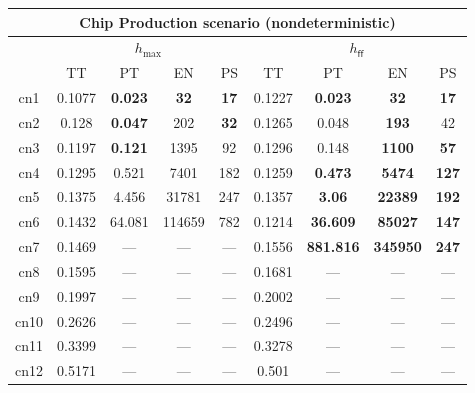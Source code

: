 \begin{tabular}{||c||c|c|c|c|c|c|c|c||}%
\multicolumn{9}{c}{\textbf{Chip Production scenario (nondeterministic)}}\\%
\hline%
&\multicolumn{4}{||c||}{$h_{\max}$}&\multicolumn{4}{||c||}{$h_{\mathsf{ff}}$}\\%
\hline%
&\small{TT}&\small{PT}&\small{EN}&\small{PS}&\small{TT}&\small{PT}&\small{EN}&\small{PS}\\%
\hline%
\hline%
cn1&\small{0.1077}&\small{\textbf{0.023}}&\small{\textbf{32}}&\small{\textbf{17}}&\small{0.1227}&\small{\textbf{0.023}}&\small{\textbf{32}}&\small{\textbf{17}}\\%
\hline%
cn2&\small{0.128}&\small{\textbf{0.047}}&\small{202}&\small{\textbf{32}}&\small{0.1265}&\small{0.048}&\small{\textbf{193}}&\small{42}\\%
\hline%
cn3&\small{0.1197}&\small{\textbf{0.121}}&\small{1395}&\small{92}&\small{0.1296}&\small{0.148}&\small{\textbf{1100}}&\small{\textbf{57}}\\%
\hline%
cn4&\small{0.1295}&\small{0.521}&\small{7401}&\small{182}&\small{0.1259}&\small{\textbf{0.473}}&\small{\textbf{5474}}&\small{\textbf{127}}\\%
\hline%
cn5&\small{0.1375}&\small{4.456}&\small{31781}&\small{247}&\small{0.1357}&\small{\textbf{3.06}}&\small{\textbf{22389}}&\small{\textbf{192}}\\%
\hline%
cn6&\small{0.1432}&\small{64.081}&\small{114659}&\small{782}&\small{0.1214}&\small{\textbf{36.609}}&\small{\textbf{85027}}&\small{\textbf{147}}\\%
\hline%
cn7&\small{0.1469}&\small{---}&\small{---}&\small{---}&\small{0.1556}&\small{\textbf{881.816}}&\small{\textbf{345950}}&\small{\textbf{247}}\\%
\hline%
cn8&\small{0.1595}&\small{---}&\small{---}&\small{---}&\small{0.1681}&\small{---}&\small{---}&\small{---}\\%
\hline%
cn9&\small{0.1997}&\small{---}&\small{---}&\small{---}&\small{0.2002}&\small{---}&\small{---}&\small{---}\\%
\hline%
cn10&\small{0.2626}&\small{---}&\small{---}&\small{---}&\small{0.2496}&\small{---}&\small{---}&\small{---}\\%
\hline%
cn11&\small{0.3399}&\small{---}&\small{---}&\small{---}&\small{0.3278}&\small{---}&\small{---}&\small{---}\\%
\hline%
cn12&\small{0.5171}&\small{---}&\small{---}&\small{---}&\small{0.501}&\small{---}&\small{---}&\small{---}\\%
\hline%
\end{tabular}